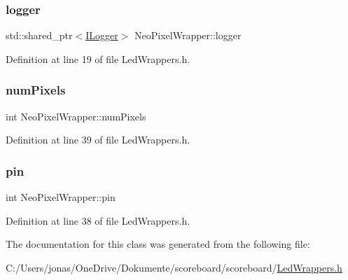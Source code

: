 \subsubsection{\texorpdfstring{logger}{logger}}
{\footnotesize\ttfamily std\+::shared\+\_\+ptr$<$\hyperlink{class_i_logger}{I\+Logger}$>$ Neo\+Pixel\+Wrapper\+::logger}



Definition at line 19 of file Led\+Wrappers.\+h.

\mbox{\label{class_neo_pixel_wrapper_a5134bf399bb6c272ae62208fea97ed79}} 
\subsubsection{\texorpdfstring{num\+Pixels}{numPixels}}
{\footnotesize\ttfamily int Neo\+Pixel\+Wrapper\+::num\+Pixels\hspace{0.3cm}{\ttfamily [private]}}



Definition at line 39 of file Led\+Wrappers.\+h.

\mbox{\label{class_neo_pixel_wrapper_a879ef1b03cfd7c10f081d7bc6a048aad}} 
\subsubsection{\texorpdfstring{pin}{pin}}
{\footnotesize\ttfamily int Neo\+Pixel\+Wrapper\+::pin\hspace{0.3cm}{\ttfamily [private]}}



Definition at line 38 of file Led\+Wrappers.\+h.



The documentation for this class was generated from the following file\+:\begin{DoxyCompactItemize}
\item 
C\+:/\+Users/jonas/\+One\+Drive/\+Dokumente/scoreboard/scoreboard/\hyperlink{_led_wrappers_8h}{Led\+Wrappers.\+h}\end{DoxyCompactItemize}
